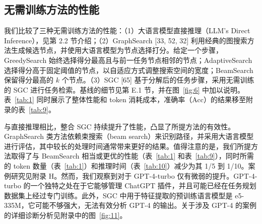 \documentclass[11pt,UTF8,fontset=fandol]{ctexart}
\begin{document}
\subsection{无需训练方法的性能}

我们比较了三种无需训练方法的性能：（1）大语言模型直接推理（LLM's Direct Inference），见第 2.2 节介绍；（2）GraphSearch [33, 52, 32] 利用经典的图搜索方法生成候选节点，并使用大语言模型为节点选择打分。给定一个步骤，GreedySearch 始终选择得分最高且与前一任务节点相邻的节点；AdaptiveSearch 选择得分高于固定阈值的节点，以自适应方式调整搜索空间的宽度；BeamSearch 保留得分最高的 $k$ 个节点。（3）SGC [65] 基于分解后的任务步骤，采用无需训练的 SGC 进行任务检索。基线的细节见第 E.1 节，并在图~\ref{fig:6} 中加以说明。表~\ref{tab:1} 同时展示了整体性能和 token 消耗成本，准确率（Acc）的结果移至附录的表~\ref{tab:9}。

与直接推理相比，整合 SGC 持续提升了性能，凸显了所提方法的有效性。GraphSearch 类方法依赖束搜索（beam search）来识别路径，并采用大语言模型进行评估，其中较长的处理时间通常带来更好的结果。值得注意的是，我们所提方法取得了与 BeamSearch 相当或更优的性能（表~\ref{tab:1} 和表~\ref{tab:9}），同时所需的 token 数量（表~\ref{tab:1}）和推理时间（表~\ref{tab:10}）减少为其 1/5 到 1/10。案例研究见附录 H。然而，我们观察到对于 GPT-4-turbo 仅有微弱的提升。GPT-4-turbo 的一个独特之处在于它能够管理 ChatGPT 插件，并且可能已经在任务规划数据集上经过专门训练。此外，SGC 中用于特征提取的预训练语言模型是 e5-335M，它可能不够强大，无法有效分析 GPT-4 的输出。关于涉及 GPT-4 的案例的详细诊断分析见附录中的图~\ref{fig:11}。
\end{document}
